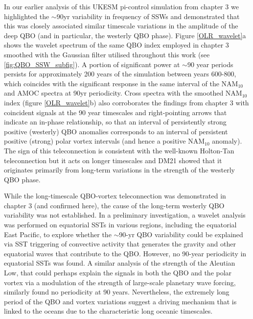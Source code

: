 In our earlier analysis of this UKESM pi-control simulation from chapter 3 we highlighted the $\sim$90yr variability in frequency of SSWs and demonstrated that this was closely associated similar timescale variations in the amplitude of the deep QBO (and in particular, the westerly QBO phase).  Figure \ref{OLR_wavelet}a shows the wavelet spectrum of the same QBO index employed in chapter 3 smoothed with the Gaussian filter utilised throughout this work (see \ref{fig:QBO_SSW_subfig}). A portion of significant power at $\sim$90 year periods persists for approximately 200 years of the simulation between years 600-800, which coincides with the significant response in the same interval of the NAM$_{10}$ and AMOC spectra at 90yr periodicity. Cross spectra with the smoothed NAM$_{10}$ index (figure \ref{OLR_wavelet}b) also corroborates the findings from chapter 3 with coincident signals at the 90 year timescales and right-pointing arrows that indicate an in-phase relationship, so that an interval of persistently strong positive (westerly) QBO anomalies  corresponds to an interval of persistent positive (strong) polar vortex intervals (and hence a positive NAM$_{10}$ anomaly). The sign of this teleconnection is consistent with the well-known Holton-Tan teleconnection \citep{luDecadalscale2008, luMechanisms2014} but it acts on longer timescales and DM21 showed that it originates primarily from long-term variations in the strength of the westerly QBO phase. 

While the long-timescale QBO-vortex teleconnection was demonstrated in chapter 3 (and confirmed here), the cause of the long-term westerly QBO variability was not established. In a preliminary investigation, a wavelet analysis was performed on equatorial SSTs in various regions, including the equatorial East Pacific, to explore whether the $\sim$90-yr QBO variability could be explained via SST triggering of  convective activity that generates the gravity and other equatorial waves that contribute to the QBO. However, no 90-year periodicity in equatorial SSTs was found. A similar analysis of the strength of the Aleutian Low, that could perhaps explain the signals in both the QBO and the polar vortex via a modulation of the strength of large-scale planetary wave forcing, similarly found no periodicity at 90 years. Nevertheless, the extremely long period of the QBO and vortex variations suggest a driving mechanism that is linked to the oceans due to the characteristic long oceanic timescales. 

